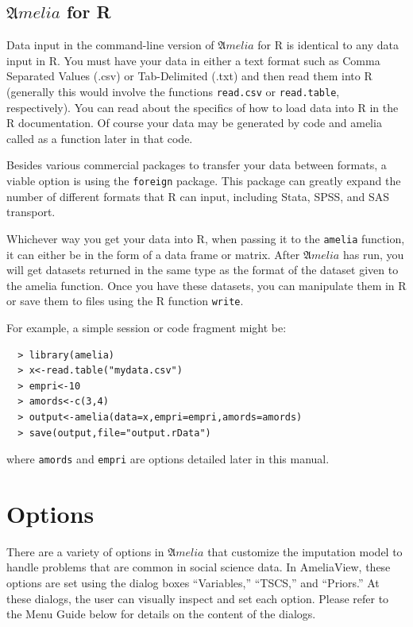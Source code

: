 \documentclass[12pt,titlepage]{article}
\newcommand{\Amelia}{\ensuremath{\mathfrak Amelia} }
\begin{document}
\subsection{\Amelia for R}
\label{sec:data-r}
Data input in the command-line version of ${\mathfrak Amelia}$ for R
is identical to any data input in R.  You must have your data in
either a text format such as Comma Separated Values (.csv) or
Tab-Delimited (.txt) and then read them into R (generally this would
involve the functions \texttt{read.csv} or \texttt{read.table},
respectively).  You can read about the specifics of how to load data
into R in the R documentation.  Of course your data may be generated
by code and amelia called as a function later in that code.

Besides various commercial packages to transfer your data between
formats, a viable option is using the \texttt{foreign} package.  This
package can greatly expand the number of different formats that R can
input, including Stata, SPSS, and SAS transport.

Whichever way you get your data into R, when passing it to the
\texttt{amelia} function, it can either be in the form of a data frame
or matrix.  After ${\mathfrak Amelia}$ has run, you will get datasets
returned in the same type as the format of the dataset given to the
amelia function.  Once you have these datasets, you can manipulate
them in R or save them to files using the R function \texttt{write}.

For example, a simple session or code fragment might be:
  \begin{verbatim}
  > library(amelia)
  > x<-read.table("mydata.csv")
  > empri<-10
  > amords<-c(3,4)
  > output<-amelia(data=x,empri=empri,amords=amords)
  > save(output,file="output.rData")
  \end{verbatim}
where \texttt{amords} and \texttt{empri} are options detailed later in
this manual.


\section{Options}
\label{sec:options}
There are a variety of options in \Amelia that customize the
imputation model to handle problems that are common in social science
data.  In AmeliaView, these options are set using the dialog boxes
``Variables,'' ``TSCS,'' and ``Priors.''  At these dialogs, the user
can visually inspect and set each option.  Please refer to the Menu
Guide below for details on the content of the dialogs.
\end{document}
